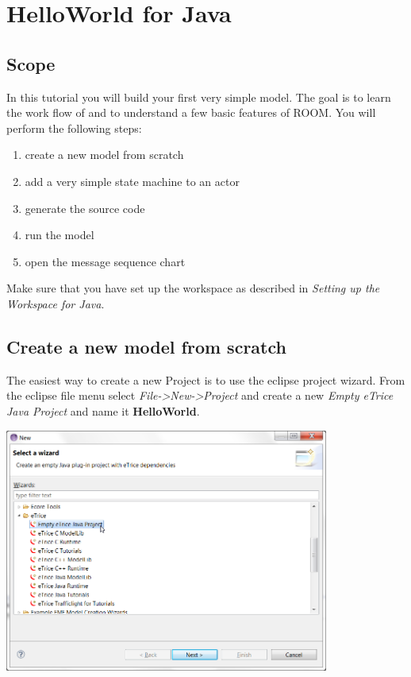 \section{HelloWorld for Java}

\subsection{Scope}

In this tutorial you will build your first very simple \eTrice{} model. The goal is to learn the work flow of 
\eTrice{} and to understand a few basic features of ROOM. You will perform the following steps:

\begin{enumerate}
\item create a new model from scratch
\item add a very simple state machine to an actor
\item generate the source code
\item run the model
\item open the message sequence chart
\end{enumerate}

Make sure that you have set up the workspace as described in \emph{Setting up the Workspace for Java}.

\subsection{Create a new model from scratch}

The easiest way to create a new \eTrice{} Project is to use the eclipse project wizard. From the eclipse file 
menu select \emph{File->New->Project} and create a new \emph{Empty eTrice Java Project} and name it \textbf{HelloWorld}.

\includegraphics[width=0.8\textwidth]{images/015-HelloWorld10.png}


